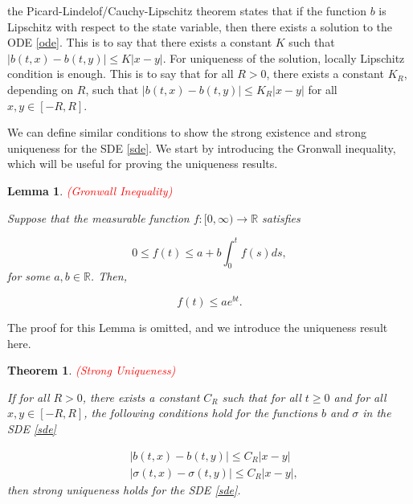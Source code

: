 \documentclass{article}
\newtheorem{theorem}{Theorem}
\newtheorem{lemma}{Lemma}
\begin{document}
the Picard-Lindelof/Cauchy-Lipschitz theorem states that if the function $b$ is Lipschitz with respect to the state variable, then there exists a solution to the ODE \eqref{ode}. This is to say that there exists a constant $K$ such that $|b(t,x)-b(t,y)|\leq K|x-y|$. For uniqueness of the solution, locally Lipschitz condition is enough. This is to say that for all $R>0$, there exists a constant $K_R$, depending on $R$, such that $|b(t,x)-b(t,y)|\leq K_R|x-y|$ for all $x,y\in[-R,R]$.

We can define similar conditions to show the strong existence and strong uniqueness for the SDE \eqref{sde}. We start by introducing the Gronwall inequality, which will be useful for proving the uniqueness results.
 
\begin{lemma} \label{lemma:gronwall} \textcolor{red}{(Gronwall Inequality)}

Suppose that the measurable function $f:[0,\infty)\rightarrow\mathbb{R}$ satisfies

\begin{equation*}
0\leq f(t)\leq a+b\int^t_0 f(s)ds,
\end{equation*}
for some $a,b\in\mathbb{R}$. Then, 

\begin{equation*}
f(t)\leq ae^{bt}.
\end{equation*}

\end{lemma}

The proof for this Lemma is omitted, and we introduce the uniqueness result here.

\begin{theorem} \label{thm:strong_uniqueness} \textcolor{red}{(Strong Uniqueness)}

If for all $R>0$, there exists a constant $C_R$ such that for all $t\geq0$ and for all $x,y\in[-R,R]$, the following conditions hold for the functions $b$ and $\sigma$ in the SDE \eqref{sde}

\begin{equation*}
\begin{aligned}
&|b(t,x)-b(t,y)|\leq C_R|x-y|\\
&|\sigma(t,x)-\sigma(t,y)|\leq C_R|x-y|,
\end{aligned}
\end{equation*}
then strong uniqueness holds for the SDE \eqref{sde}.

\end{theorem}
\end{document}
